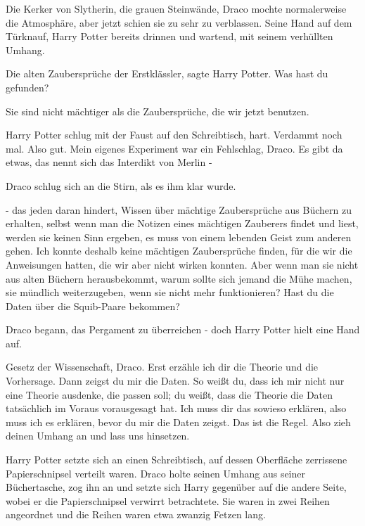 Die Kerker von Slytherin, die grauen Steinwände, Draco mochte normalerweise die
Atmosphäre, aber jetzt schien sie zu sehr zu verblassen. Seine Hand auf dem
Türknauf, Harry Potter bereits drinnen und wartend, mit seinem verhüllten
Umhang.

\glqq Die alten Zaubersprüche der Erstklässler\grqq{}, sagte Harry Potter. \glqq
Was hast du gefunden?\grqq{}

\glqq Sie sind nicht mächtiger als die Zaubersprüche, die wir jetzt
benutzen.\grqq{}

Harry Potter schlug mit der Faust auf den Schreibtisch, hart. \glqq Verdammt
noch mal. Also gut. Mein eigenes Experiment war ein Fehlschlag, Draco. Es gibt
da etwas, das nennt sich das Interdikt von Merlin -\grqq{}

Draco schlug sich an die Stirn, als es ihm klar wurde.

\glqq - das jeden daran hindert, Wissen über mächtige Zaubersprüche aus Büchern
zu erhalten, selbst wenn man die Notizen eines mächtigen Zauberers findet und
liest, werden sie keinen Sinn ergeben, es muss von einem lebenden Geist zum
anderen gehen. Ich konnte deshalb keine mächtigen Zaubersprüche finden, für die
wir die Anweisungen hatten, die wir aber nicht wirken konnten. Aber wenn man sie
nicht aus alten Büchern herausbekommt, warum sollte sich jemand die Mühe machen,
sie mündlich weiterzugeben, wenn sie nicht mehr funktionieren? Hast du die Daten
über die Squib-Paare bekommen?\grqq{}


Draco begann, das Pergament zu überreichen - doch Harry Potter hielt eine Hand
auf.

\glqq Gesetz der Wissenschaft, Draco. Erst erzähle ich dir die Theorie und die
Vorhersage. Dann zeigst du mir die Daten. So weißt du, dass ich mir nicht nur
eine Theorie ausdenke, die passen soll; du weißt, dass die Theorie die Daten
tatsächlich im Voraus vorausgesagt hat. Ich muss dir das sowieso erklären, also
muss ich es erklären, bevor du mir die Daten zeigst. Das ist die Regel. Also
zieh deinen Umhang an und lass uns hinsetzen.\grqq{}

Harry Potter setzte sich an einen Schreibtisch, auf dessen Oberfläche zerrissene
Papierschnipsel verteilt waren. Draco holte seinen Umhang aus seiner
Büchertasche, zog ihn an und setzte sich Harry gegenüber auf die andere Seite,
wobei er die Papierschnipsel verwirrt betrachtete. Sie waren in zwei Reihen
angeordnet und die Reihen waren etwa zwanzig Fetzen lang.

